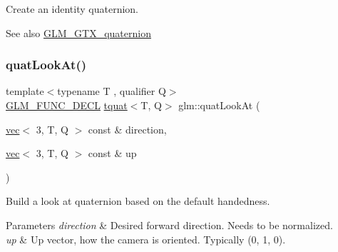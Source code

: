 Create an identity quaternion.

\begin{DoxySeeAlso}{See also}
\mbox{\hyperlink{group__gtx__quaternion}{G\+L\+M\+\_\+\+G\+T\+X\+\_\+quaternion}} 
\end{DoxySeeAlso}
\mbox{\label{group__gtx__quaternion_ga668d9ec9964ced2b455d416677e1e8b9}} 
\subsubsection{\texorpdfstring{quat\+Look\+At()}{quatLookAt()}}
{\footnotesize\ttfamily template$<$typename T , qualifier Q$>$ \\
\mbox{\hyperlink{setup_8hpp_ab2d052de21a70539923e9bcbf6e83a51}{G\+L\+M\+\_\+\+F\+U\+N\+C\+\_\+\+D\+E\+CL}} \mbox{\hyperlink{structglm_1_1tquat}{tquat}}$<$T, Q$>$ glm\+::quat\+Look\+At (\begin{DoxyParamCaption}\item[{\mbox{\hyperlink{structglm_1_1vec}{vec}}$<$ 3, T, Q $>$ const \&}]{direction,  }\item[{\mbox{\hyperlink{structglm_1_1vec}{vec}}$<$ 3, T, Q $>$ const \&}]{up }\end{DoxyParamCaption})}

Build a look at quaternion based on the default handedness.


\begin{DoxyParams}{Parameters}
{\em direction} & Desired forward direction. Needs to be normalized. \\
\hline
{\em up} & Up vector, how the camera is oriented. Typically (0, 1, 0). \\
\hline
\end{DoxyParams}
\mbox{\label{group__gtx__quaternion_ga6f1b3fba52fcab952d0ab523177ff443}} 
